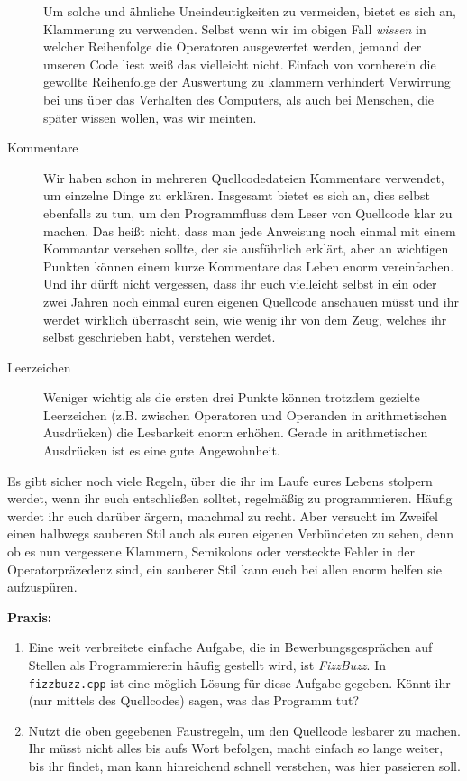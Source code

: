\begin{description}
        Um solche und ähnliche Uneindeutigkeiten zu vermeiden, bietet es sich
        an, Klammerung zu verwenden. Selbst wenn wir im obigen Fall
        \emph{wissen} in welcher Reihenfolge die Operatoren ausgewertet werden,
        jemand der unseren Code liest weiß das vielleicht nicht. Einfach von
        vornherein die gewollte Reihenfolge der Auswertung zu klammern
        verhindert Verwirrung bei uns über das Verhalten des Computers, als
        auch bei Menschen, die später wissen wollen, was wir meinten.
    \item[Kommentare]
        Wir haben schon in mehreren Quellcodedateien Kommentare verwendet, um
        einzelne Dinge zu erklären. Insgesamt bietet es sich an, dies selbst
        ebenfalls zu tun, um den Programmfluss dem Leser von Quellcode klar zu
        machen. Das heißt nicht, dass man jede Anweisung noch einmal mit einem
        Kommantar versehen sollte, der sie ausführlich erklärt, aber an
        wichtigen Punkten können einem kurze Kommentare das Leben enorm
        vereinfachen. Und ihr dürft nicht vergessen, dass ihr euch vielleicht
        selbst in ein oder zwei Jahren noch einmal euren eigenen Quellcode
        anschauen müsst und ihr werdet wirklich überrascht sein, wie wenig ihr
        von dem Zeug, welches ihr selbst geschrieben habt, verstehen werdet.
    \item[Leerzeichen]
        Weniger wichtig als die ersten drei Punkte können trotzdem gezielte
        Leerzeichen (z.B. zwischen Operatoren und Operanden in arithmetischen
        Ausdrücken) die Lesbarkeit enorm erhöhen. Gerade in arithmetischen
        Ausdrücken ist es eine gute Angewohnheit.
\end{description}

Es gibt sicher noch viele Regeln, über die ihr im Laufe eures Lebens stolpern
werdet, wenn ihr euch entschließen solltet, regelmäßig zu programmieren. Häufig
werdet ihr euch darüber ärgern, manchmal zu recht. Aber versucht im Zweifel
einen halbwegs sauberen Stil auch als euren eigenen Verbündeten zu sehen, denn
ob es nun vergessene Klammern, Semikolons oder versteckte Fehler in der
Operatorpräzedenz sind, ein sauberer Stil kann euch bei allen enorm helfen sie
aufzuspüren.

\textbf{Praxis:}
\begin{enumerate}
    \item Eine weit verbreitete einfache Aufgabe, die in Bewerbungsgesprächen
        auf Stellen als Programmiererin häufig gestellt wird, ist
        \emph{FizzBuzz}. In \texttt{fizzbuzz.cpp} ist eine möglich Lösung für
        diese Aufgabe gegeben. Könnt ihr (nur mittels des Quellcodes) sagen,
        was das Programm tut?
    \item Nutzt die oben gegebenen Faustregeln, um den Quellcode lesbarer zu
        machen. Ihr müsst nicht alles bis aufs Wort befolgen, macht einfach so
        lange weiter, bis ihr findet, man kann hinreichend schnell verstehen,
        was hier passieren soll.
\end{enumerate}

